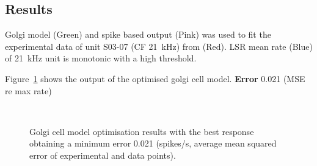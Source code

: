 \newpage






\clearpage
\subsection{Results}

Golgi model (Green) and spike based output (Pink) was used to
fit the experimental data of unit S03-07 (CF 21~kHz) from
\citep{GhoshalKim:1996} (Red).  LSR mean rate (Blue) of 21~kHz unit is
monotonic with a high threshold.

Figure~\ref{fig:GolgiResult} shows the output of the optimised golgi cell model.
\textbf{Error} 0.021 (MSE re max rate)


\begin{figure}[htb]
  \centering %
   \\
  \caption{Golgi cell model optimisation results with the best response obtaining a minimum error 0.021 (spikes/s, average mean squared error of experimental and data points). }\label{fig:GolgiResult}
\end{figure}



